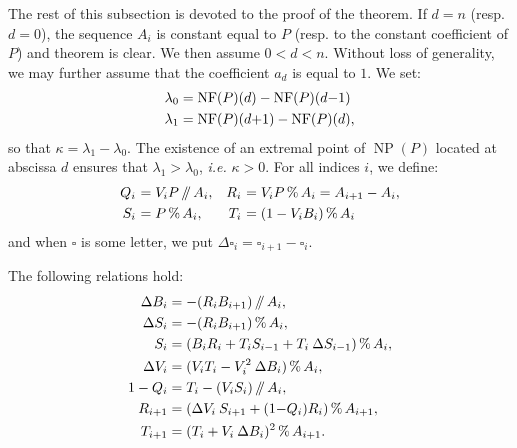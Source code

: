 \documentclass{sig-alternate-05-2015}
\DeclareMathOperator{\NP}{NP}
\newcommand{\NF}{\text{\rm NF}}
\renewcommand{\mod}{\,\%\,}
\renewcommand{\div}{\,/\hspace{-0.3em}/\,}
\begin{document}
The rest of this subsection is devoted to the proof of the theorem.
If $d = n$ (resp. $d = 0$), the sequence $A_i$ is constant equal to
$P$ (resp. to the constant coefficient of $P$) and theorem is clear.
We then assume $0 < d < n$. Without loss of generality, we may further 
assume that the coefficient $a_d$ is equal to $1$. We set:
\begin{align*}
\lambda_0 & = \NF(P)(d) - \NF(P)(d{-}1) \\
\lambda_1 & = \NF(P)(d{+}1) - \NF(P)(d),
\end{align*}
so that $\kappa = \lambda_1 - \lambda_0$.
The existence of an extremal point of $\NP(P)$ located at abscissa
$d$ ensures that $\lambda_1 > \lambda_0$, \emph{i.e.} $\kappa > 0$.
For all indices $i$, we define:
$$\begin{array}{r@{\,\,}lr@{\,\,}l}
Q_i &= V_i P \div A_i, &
R_i & = V_i P \mod A_i = A_{i+1} - A_i, 
\smallskip \\
S_i &= P \mod A_i, &
T_i &= (1 - V_i B_i) \mod A_i
\end{array}$$
and when $\square$ is some letter, we put $\Delta \square_i = \square_{i+1} 
- \square_i$.

\begin{lem} \label{lem:formulae}
The following relations hold:
\begin{align}
\Delta B_i &= -(R_i B_{i+1}) \div A_i, \label{eqdef:Biminus} \\
\Delta S_i &= -(R_i B_{i+1}) \mod A_i,  \label{eqdef:Siminus} \\
S_{i} &= (B_i R_i + T_i S_{i-1} + T_i \: \Delta S_{i-1}) \mod A_{i}, \label{eqdef:Si2}  \\
\Delta V_i &= (V_i T_i - V_i^2 \: \Delta B_i) \mod A_{i}, \label{eqdef:Viminus}\\
1-Q_i &= T_i - (V_i S_i) \div A_i, \label{eqdef:Qiminus}\\
R_{i+1} &= (\Delta V_i \: S_{i+1}+(1{-}Q_i)R_i) \mod A_{i+1}, \label{eq:Riplus}\\
T_{i+1} &= (T_i + V_i \: \Delta B_i)^2 \mod{A_{i+1}}. \label{eq:ViBiplus}
\end{align}
\end{lem}
\end{document}
